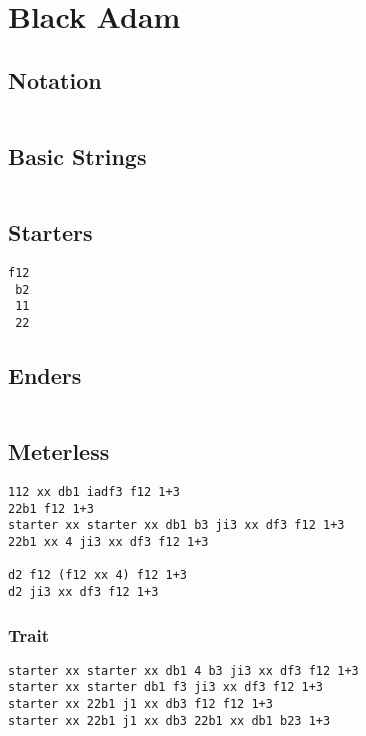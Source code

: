 \documentclass[main.tex]{subfiles}
\begin{document}
\chapter{Black Adam}

\section{Notation}
\begin{lstlisting}[language=FG]

\end{lstlisting}


\section{Basic Strings}

\begin{lstlisting}[language=FG]
\end{lstlisting}

\section{Starters}
\begin{lstlisting}[language=FG]
 f12
 b2
 11
 22
\end{lstlisting}

\section{Enders}

\begin{lstlisting}[language=FG]
\end{lstlisting}

\section{Meterless}


\begin{lstlisting}[language=FG]
112 xx db1 iadf3 f12 1+3
22b1 f12 1+3
starter xx starter xx db1 b3 ji3 xx df3 f12 1+3
22b1 xx 4 ji3 xx df3 f12 1+3

d2 f12 (f12 xx 4) f12 1+3
d2 ji3 xx df3 f12 1+3
\end{lstlisting}

\subsection{Trait}

\begin{lstlisting}[language=FG]
starter xx starter xx db1 4 b3 ji3 xx df3 f12 1+3
starter xx starter db1 f3 ji3 xx df3 f12 1+3
starter xx 22b1 j1 xx db3 f12 f12 1+3
starter xx 22b1 j1 xx db3 22b1 xx db1 b23 1+3
\end{lstlisting}
\end{document}
